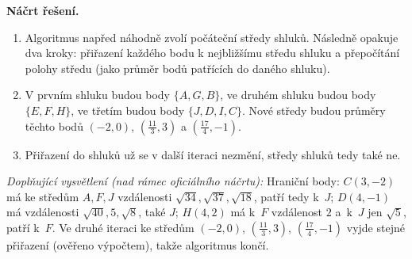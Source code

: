 \medskip
\noindent\textbf{Náčrt řešení.}\par
\begin{enumerate}
  \item Algoritmus napřed náhodně zvolí počáteční středy shluků. Následně opakuje dva kroky: přiřazení každého bodu k
    nejbližšímu středu shluku a přepočítání polohy středu (jako průměr bodů patřících do daného shluku).
  \item V prvním shluku budou body $\{A, G, B\}$, ve druhém shluku budou body $\{E, F, H\}$, ve třetím budou body $\{J, D, I, C\}$.
    Nové středy budou průměry těchto bodů $(-2, 0)$, $(\tfrac{11}{3}, 3)$ a $(\tfrac{17}{4}, -1)$.
  \item Přiřazení do shluků už se v další iteraci nezmění, středy shluků tedy také ne.
\end{enumerate}

\medskip
\noindent\textit{Doplňující vysvětlení (nad rámec oficiálního náčrtu):} Hraniční body: $C(3,-2)$ má ke středům $A,F,J$ vzdálenosti $\sqrt{34},\sqrt{37},\sqrt{18}$, patří tedy k~$J$; $D(4,-1)$ má vzdálenosti $\sqrt{40},5,\sqrt8$, také $J$; $H(4,2)$ má k~$F$ vzdálenost $2$ a~k~$J$ jen $\sqrt5$, patří k~$F$. Ve druhé iteraci ke středům $(-2,0)$, $(\tfrac{11}{3},3)$, $(\tfrac{17}{4},-1)$ vyjde stejné přiřazení (ověřeno výpočtem), takže algoritmus končí.
